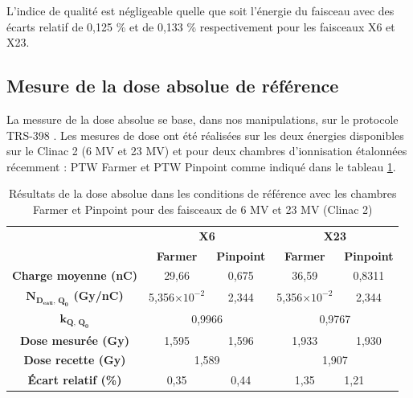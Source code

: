 \documentclass{article}
\begin{document}
L'indice de qualité est négligeable quelle que soit l'énergie du faisceau avec des écarts relatif de 0,125 \% et de 0,133 \% respectivement pour les faisceaux X6 et X23.

\subsection{Mesure de la dose absolue de référence}

La messure de la dose absolue se base, dans nos manipulations, sur le protocole TRS-398 \cite{international2001iaea}. Les mesures de dose ont été réalisées sur les deux énergies disponibles sur le Clinac 2 (6 MV et 23 MV) et pour deux chambres d'ionnisation étalonnées récemment : PTW  Farmer et PTW Pinpoint comme indiqué dans le tableau \ref*{table_dose_abs_resultats}.

\begin{table}[h!]
  \centering
  \begin{tabular}{c|cc|cc|}
  \cline{2-5}
                                             & \multicolumn{2}{c|}{\textbf{X6}}    & \multicolumn{2}{c|}{\textbf{X23}}   \\ \cline{2-5} 
                                             & \textbf{Farmer} & \textbf{Pinpoint} & \textbf{Farmer} & \textbf{Pinpoint} \\ \hline
  \multicolumn{1}{|c|}{\textbf{Charge moyenne (nC)}} & 29,66           & 0,675             & 36,59           & 0,8311            \\
  \multicolumn{1}{|c|}{\textbf{$\mathbf{N_{D_{eau},\, Q_0}}$ (Gy/nC)}} & 5,356$\times 10^{-2}$ & 2,344 & 5,356$\times 10^{-2}$ & 2,344                     \\
  \multicolumn{1}{|c|}{\textbf{$\mathbf{k_{Q,\, Q_0}}$}}       & \multicolumn{2}{c|}{0,9966}   & \multicolumn{2}{c|}{0,9767}                       \\
  \multicolumn{1}{|c|}{\textbf{Dose mesurée (Gy)}}   & 1,595           & 1,596             & 1,933            & 1,930             \\
  \multicolumn{1}{|c|}{\textbf{Dose recette (Gy)}}             & \multicolumn{2}{c|}{1,589}    & \multicolumn{2}{c|}{1,907}                        \\
  \multicolumn{1}{|c|}{\textbf{Écart relatif (\%)}}            & 0,35                  & 0,44  & 1,35                  & \multicolumn{1}{l|}{1,21} \\ \hline
  \end{tabular}
  \caption{Résultats de la dose absolue dans les conditions de référence avec les chambres Farmer et Pinpoint pour des faisceaux de 6 MV et 23 MV (Clinac 2)}
  \label{table_dose_abs_resultats}
\end{table}
\end{document}
